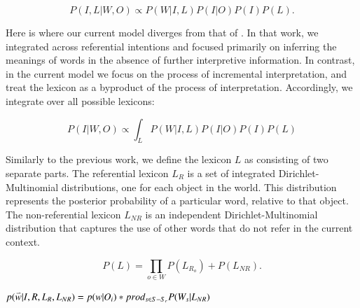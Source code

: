 \documentclass[man,noapacite,12pt]{apa2}
\newcommand{\vect}[1]{\accentset{\rightharpoonup}{#1}}
\begin{document}
\begin{equation}
P( I, L | W, O) \propto P(W | I, L) P(I | O) P(I) P(L).
\end{equation}

Here is where our current model diverges from that of . In that work, we integrated across referential intentions and focused primarily on inferring the meanings of words in the absence of further interpretive information. In contrast, in the current model we focus on the process of incremental interpretation, and treat the lexicon as a byproduct of the process of interpretation. Accordingly, we integrate over all possible lexicons:

\begin{equation}
P( I| W, O) \propto \int_L{P(W | I, L) P(I | O) P(I)  P(L) }
\end{equation}


Similarly to the previous work, we define the lexicon $L$ as consisting of two separate parts. The referential lexicon $L_R$ is a set of integrated Dirichlet-Multinomial distributions, one for each object in the world. This distribution represents the posterior probability of a particular word, relative to that object. The non-referential lexicon $L_{NR}$ is an independent Dirichlet-Multinomial distribution that captures the use of other words that do not refer in the current context.

\begin{equation}
P(L) = \prod_{o \in W}{P(L_{R_o})} + P(L_{NR}).
\end{equation}

 



$p(\vect{w} | I, R, L_R, L_{NR}) = p(w|O_i) * prod_{s \in S - S_r} {P(W_s | L_{NR})}$
\end{document}
